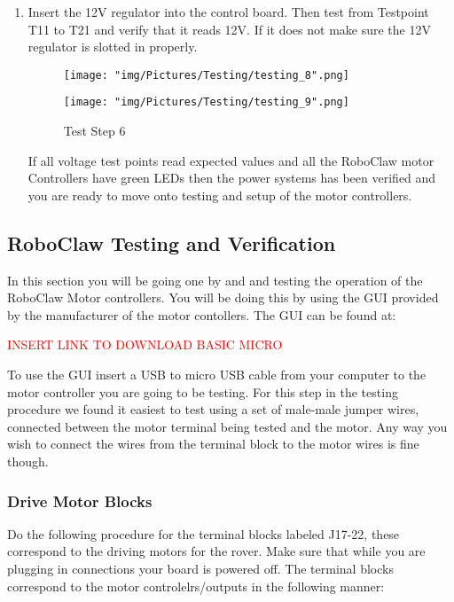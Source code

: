 \documentclass[12pt]{article}
\begin{document}
\begin{enumerate}
\item Insert the 12V regulator into the control board. Then test from Testpoint T11 to T21 and verify that it reads 12V. If it does not make sure the 12V regulator is slotted in properly.

\begin{figure}[H]
  \centering
  \begin{minipage}[b]{0.45\textwidth}
    \texttt{[image: "img/Pictures/Testing/testing\_8".png]}
  \end{minipage}
  \hfill
  \begin{minipage}[b]{0.45\textwidth}
    \texttt{[image: "img/Pictures/Testing/testing\_9".png]}
  \end{minipage}
  \caption{Test Step 6}
  \label{test_6}
\end{figure}

If all voltage test points read expected values and all the RoboClaw motor Controllers have green LEDs then the power systems has been verified and you are ready to move onto testing and setup of the motor controllers. 

\end{enumerate}

\subsection{RoboClaw Testing and Verification}

In this section you will be going one by and and testing the operation of the RoboClaw Motor controllers. You will be doing this by using the GUI provided by the manufacturer of the motor contollers. The GUI can be found at:

\textcolor{red}{INSERT LINK TO DOWNLOAD BASIC MICRO}

\noindent To use the GUI insert a USB to micro USB cable from your computer to the motor controller you are going to be testing. For this step in the testing procedure we found it easiest to test using a set of male-male jumper wires, connected between the motor terminal being tested and the motor. Any way you wish to connect the wires from the terminal block to the motor wires is fine though.

\subsubsection{Drive Motor Blocks}

\noindent Do the following procedure for the terminal blocks labeled J17-22, these correspond to the driving motors for the rover. Make sure that while you are plugging in connections your board is powered off.  The terminal blocks correspond to the motor controlelrs/outputs in the following manner:
\end{document}
